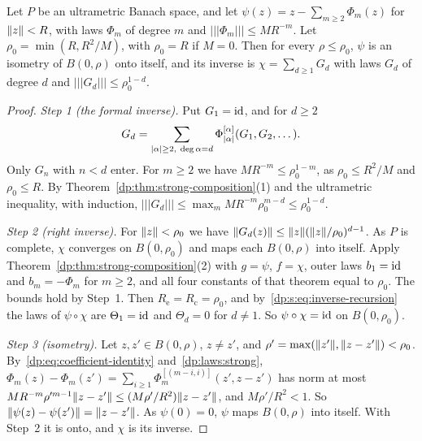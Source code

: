 \begin{theorem}\label{dp:thm:strong-inverse}
Let $P$ be an ultrametric Banach space, and let $\psi(z)=z-\sum_{m\ge2}\Phi_m(z)$ for $\lVert z\rVert<R$, with laws $\Phi_m$ of degree $m$ and $\lvert\!\lvert\!\lvert \Phi_m\rvert\!\rvert\!\rvert\le MR^{-m}$. Let $\rho_0=\min(R,R^2/M)$, with $\rho_0=R$ if $M=0$. Then for every $\rho\le\rho_0$, $\psi$ is an isometry of $B(0,\rho)$ onto itself, and its inverse is $\chi=\sum_{d\ge1}G_d$ with laws $G_d$ of degree $d$ and $\lvert\!\lvert\!\lvert G_d\rvert\!\rvert\!\rvert\le\rho_0^{1-d}$.
\end{theorem}

\begin{proof}
\emph{Step 1 (the formal inverse).} Put $G_1=\mathrm{id}$, and for $d\ge2$
\begin{equation}\label{dp:s:eq:inverse-recursion}
 G_d=\sum_{\abs\alpha\ge2,\ \deg\alpha=d}\Phi_{\abs\alpha}^{[\alpha]}(G_1,G_2,\dots).
\end{equation}
Only $G_n$ with $n<d$ enter. For $m\ge2$ we have $MR^{-m}\le\rho_0^{1-m}$, as $\rho_0\le R^2/M$ and $\rho_0\le R$. By Theorem~\ref{dp:thm:strong-composition}(1) and the ultrametric inequality, with induction, $\lvert\!\lvert\!\lvert G_d\rvert\!\rvert\!\rvert\le\max_mMR^{-m}\rho_0^{m-d}\le\rho_0^{1-d}$.

\emph{Step 2 (right inverse).} For $\lVert z\rVert<\rho_0$ we have $\lVert G_d(z)\rVert\le\lVert z\rVert(\lVert z\rVert/\rho_0)^{d-1}$. As $P$ is complete, $\chi$ converges on $B(0,\rho_0)$ and maps each $B(0,\rho)$ into itself. Apply Theorem~\ref{dp:thm:strong-composition}(2) with $g=\psi$, $f=\chi$, outer laws $b_1=\mathrm{id}$ and $b_m=-\Phi_m$ for $m\ge2$, and all four constants of that theorem equal to $\rho_0$. The bounds hold by Step~1. Then $R_{\mathrm e}=R_{\mathrm c}=\rho_0$, and by~\eqref{dp:s:eq:inverse-recursion} the laws of $\psi\circ\chi$ are $\Theta_1=\mathrm{id}$ and $\Theta_d=0$ for $d\ne1$. So $\psi\circ\chi=\mathrm{id}$ on $B(0,\rho_0)$.

\emph{Step 3 (isometry).} Let $z,z'\in B(0,\rho)$, $z\ne z'$, and $\rho'=\max(\lVert z'\rVert,\lVert z-z'\rVert)<\rho_0$. By~\eqref{dp:eq:coefficient-identity} and~\eqref{dp:laws:strong}, $\Phi_m(z)-\Phi_m(z')=\sum_{i\ge1}\Phi_m^{[(m-i,i)]}(z',z-z')$ has norm at most $MR^{-m}\rho'^{m-1}\lVert z-z'\rVert\le(M\rho'/R^2)\lVert z-z'\rVert$, and $M\rho'/R^2<1$. So $\lVert \psi(z)-\psi(z')\rVert=\lVert z-z'\rVert$. As $\psi(0)=0$, $\psi$ maps $B(0,\rho)$ into itself. With Step~2 it is onto, and $\chi$ is its inverse.
\end{proof}

